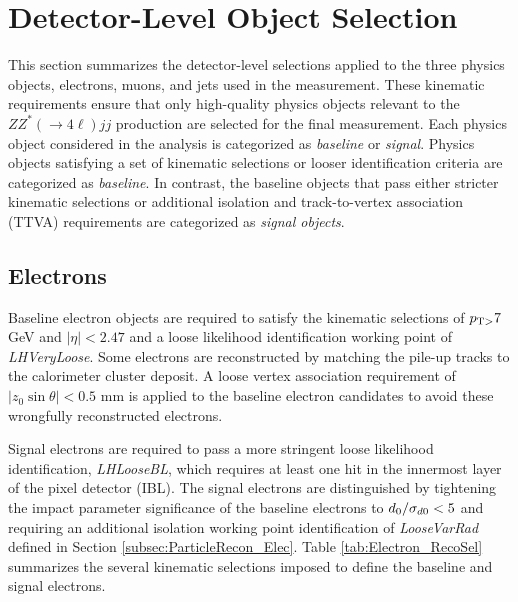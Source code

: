 \section{Detector-Level Object Selection}
\label{sec:ObjReconstruction}

This section summarizes the detector-level selections applied to the three physics objects, electrons, muons, and jets used in the measurement. These kinematic requirements ensure that only high-quality physics objects relevant to the $ZZ^*(\rightarrow 4\ell) jj$ production are selected for the final measurement. Each physics object considered in the analysis is categorized as \textit{baseline} or \textit{signal}. Physics objects satisfying a set of kinematic selections or looser identification criteria are categorized as \textit{baseline}. In contrast, the baseline objects that pass either stricter kinematic selections or additional isolation and track-to-vertex association (TTVA) requirements are categorized as \textit{signal objects}.

\subsection{Electrons}
\label{subsec:ElecRecon}

Baseline electron objects are required to satisfy the kinematic selections of $p_{\textrm{T} >} 7$ GeV and $|\eta| < 2.47$ and a loose likelihood identification working point of \textit{LHVeryLoose}. Some electrons are reconstructed by matching the pile-up tracks to the calorimeter cluster deposit. A loose vertex association requirement of $|z_{0}\sin\theta| < 0.5 $ mm is applied to the baseline electron candidates to avoid these wrongfully reconstructed electrons. 

Signal electrons are required to pass a more stringent loose likelihood identification, \textit{LHLooseBL}, which requires at least one hit in the innermost layer of the pixel detector (IBL). The signal electrons are distinguished by tightening the impact parameter significance of the baseline electrons to $d_{0}/ \sigma_{d0} < 5$ and requiring an additional isolation working point identification of \textit{LooseVarRad} defined in Section \ref{subsec:ParticleRecon_Elec}. Table \ref{tab:Electron_RecoSel} summarizes the several kinematic selections imposed to define the baseline and signal electrons.

